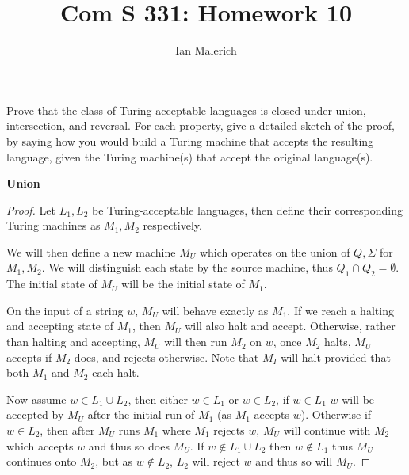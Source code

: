 \documentclass[12pt]{jhwhw}
\author{Ian Malerich}
\title{Com S 331: Homework 10}
\begin{document}
\raggedright

\problem{}

	Prove that the class of Turing-acceptable languages is closed under union, intersection, and reversal.
	For each property, give a detailed \underline{sketch} of the proof, by saying how you would
	build a Turing machine that accepts the resulting language, given the Turing machine(s) that
	accept the original language(s).

\solution

	\textbf{Union} \\
	\begin{proof}
		Let $L_1, L_2$ be Turing-acceptable languages, then define their corresponding 
		Turing machines as $M_1, M_2$ respectively.

		We will then define a new machine $M_U$ which operates on the union of
		$Q,\Sigma$ for $M_1, M_2$. We will distinguish each state by the source machine,
		thus $Q_1 \cap Q_2 = \emptyset$. The initial state of $M_U$ will be the initial
		state of $M_1$.
		
		On the input of a string $w$, $M_U$ will behave exactly as $M_1$. If 
		we reach a halting and accepting state of $M_1$, then $M_U$ will also halt and accept.
		Otherwise, rather than halting and accepting, $M_U$ will then run $M_2$ on $w$, 
		once $M_2$ halts, $M_U$ accepts if $M_2$ does, and rejects otherwise.
		Note that $M_I$ will halt provided that both $M_1$ and $M_2$ each halt.

		Now assume $w\in L_1\cup L_2$, then either $w\in L_1$ or $w\in L_2$, if $w\in L_1$
		$w$ will be accepted by $M_U$ after the initial run of $M_1$ (as $M_1$ accepts $w$).
		Otherwise if $w\in L_2$, then after $M_U$ runs $M_1$ where $M_1$ rejects $w$,
		$M_U$ will continue with $M_2$ which accepts $w$ and thus so does $M_U$.
		If $w\not\in L_1\cup L_2$ then $w\notin L_1$ thus $M_U$ continues onto $M_2$,
		but as $w\not\in L_2$, $L_2$ will reject $w$ and thus so will $M_U$.

	\end{proof}
\end{document}

